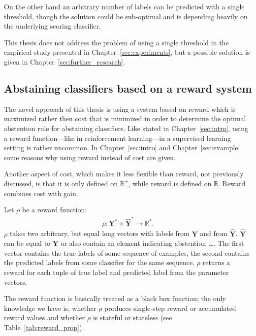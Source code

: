 \documentclass[twoside,11pt]{article}
\def\Y{\textbf{Y}}
\begin{document}
On the other hand an arbitrary number of labels can be
predicted with a single threshold, though the solution
could be sub-optimal and is depending heavily on the
underlying scoring classifier.

This thesis does not address the problem of using a single
threshold in the empirical
study presented in Chapter~\ref{sec:experiments}, but a
possible solution is given in
Chapter~\ref{sec:further_research}.

\subsection{Abstaining classifiers based on a reward
    system}
\label{subsec:reward}

The novel approach of this thesis is using a system based
on reward which is maximized rather then cost that is
minimized in order to determine the optimal abstention
rule for abstaining classifiers.
Like stated in Chapter~\ref{sec:intro}, using a reward
function---like in reinforcement learning---in a
supervised learning setting is rather uncommon.
In Chapter~\ref{sec:intro} and Chapter~\ref{sec:example}
some reasons why using reward instead of cost are given.

Another aspect of cost, which makes it less flexible than
reward, not previously discussed, is that it is only
defined on $\mathbb{R}^+$, while reward is defined on
$\mathbb{R}$.
Reward combines cost with gain.

Let $\rho$ be a reward function:
\begin{align}
  \label{eq:rho}
  \rho: \Y^* \times \hat{\Y}^* \rightarrow \mathbb{R}^*.
\end{align}
$\rho$ takes two arbitrary, but equal long vectors with
labels from $\Y$ and from $\hat{\Y}$. $\hat{\Y}$ can be
equal to $\Y$ or also contain an element indicating
abstention $\bot$.
The first vector contains the true labels of some sequence
of examples, the second contains the predicted labels from
some classifier for the same sequence.
$\rho$ returns a reward for each tuple of true
label and predicted label from the parameter vectors.

The reward function is basically treated as a black box
function; the only knowledge we have is, whether $\rho$
produces single-step reward or accumulated reward values
and whether $\rho$ is stateful or stateless
(see Table~\ref{tab:reward_prop}).
\end{document}
